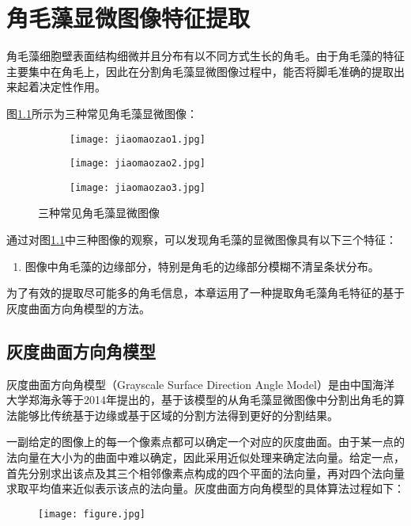 

\chapter{角毛藻显微图像特征提取}
\label{cha2}
角毛藻细胞壁表面结构细微并且分布有以不同方式生长的角毛。由于角毛藻的特征主要集中在角毛上，因此在分割角毛藻显微图像过程中，能否将脚毛准确的提取出来起着决定性作用。

图\ref{jiaomaozao}所示为三种常见角毛藻显微图像：
\begin{figure}[h]
  \centering
  \begin{subfigure}{3cm}
    \texttt{[image: jiaomaozao1.jpg]}
  \end{subfigure}
  \hspace{4em}
  \begin{subfigure}{0.2\textwidth}
    \texttt{[image: jiaomaozao2.jpg]}
  \end{subfigure}
  \hspace{4em}
  \begin{subfigure}{0.25\textwidth}
    \texttt{[image: jiaomaozao3.jpg]}
  \end{subfigure}
  \caption{三种常见角毛藻显微图像}
  \label{jiaomaozao}
\end{figure}

通过对图\ref{jiaomaozao}中三种图像的观察，可以发现角毛藻的显微图像具有以下三个特征：
\begin{enumerate}
，并且其颜色通常与背景十分相近；
；
\item 图像中角毛藻的边缘部分，特别是角毛的边缘部分模糊不清呈条状分布。
\end{enumerate}

为了有效的提取尽可能多的角毛信息，本章运用了一种提取角毛藻角毛特征的基于灰度曲面方向角模型的方法。
\section{灰度曲面方向角模型}
 灰度曲面方向角模型（Grayscale Surface Direction Angle Model）是由中国海洋大学郑海永\cite{zheng2014automatic}等于2014年提出的，基于该模型的从角毛藻显微图像中分割出角毛的算法能够比传统基于边缘或基于区域的分割方法得到更好的分割结果。

一副给定的图像上的每一个像素点都可以确定一个对应的灰度曲面。由于某一点的法向量在大小为的曲面中难以确定，因此采用近似处理来确定法向量。给定一点，首先分别求出该点及其三个相邻像素点构成的四个平面的法向量，再对四个法向量求取平均值来近似表示该点的法向量。灰度曲面方向角模型的具体算法过程如下：
\begin{figure}[ht!]
   \centering
  \texttt{[image: figure.jpg]}
  \caption{}
   \label{GSDAM}
 \end{figure}
 
